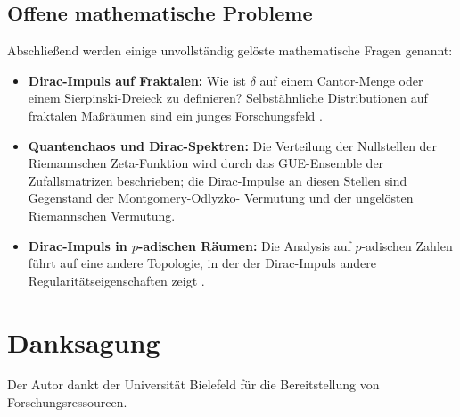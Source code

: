 ﻿\documentclass[a4paper,12pt]{article}
\theoremstyle{definition}
\begin{document}
\subsection{Offene mathematische Probleme}

Abschlie{\ss}end werden einige unvollst\"andig gel\"oste mathematische Fragen genannt:

\begin{itemize}
    \item \textbf{Dirac-Impuls auf Fraktalen:} Wie ist $\delta$ auf einem Cantor-Menge
          oder einem Sierpinski-Dreieck zu definieren? Selbst\"ahnliche Distributionen
          auf fraktalen Ma{\ss}r\"aumen sind ein junges Forschungsfeld \cite{strichartz1999}.
    \item \textbf{Quantenchaos und Dirac-Spektren:} Die Verteilung der Nullstellen der
          Riemannschen Zeta-Funktion wird durch das GUE-Ensemble der Zufallsmatrizen
          beschrieben; die Dirac-Impulse an diesen Stellen sind Gegenstand der Montgomery-Odlyzko-
          Vermutung und der ungelösten Riemannschen Vermutung.
    \item \textbf{Dirac-Impuls in $p$-adischen R\"aumen:} Die Analysis auf $p$-adischen
          Zahlen f\"uhrt auf eine andere Topologie, in der der Dirac-Impuls andere
          Regularit\"atseigenschaften zeigt \cite{vvz1994}.
\end{itemize}

\section*{Danksagung}

Der Autor dankt der Universit\"at Bielefeld f\"ur die Bereitstellung von Forschungsressourcen.
\end{document}
